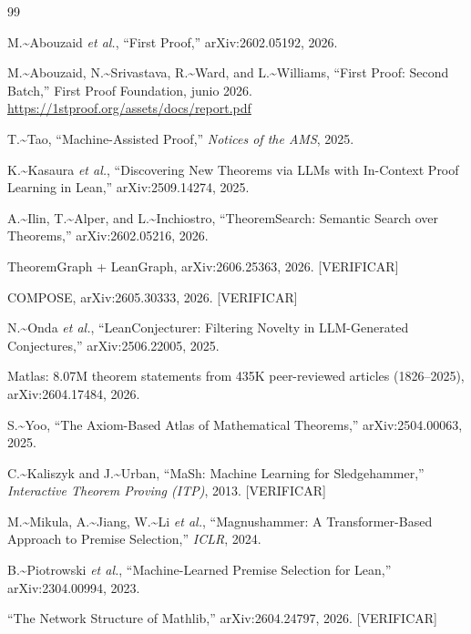 \documentclass[12pt,a4paper]{article}
\theoremstyle{remark}
\begin{document}
\begin{thebibliography}{99}

M.\textasciitilde{}Abouzaid \emph{et al.}, ``First Proof,''
arXiv:2602.05192, 2026.

M.\textasciitilde{}Abouzaid, N.\textasciitilde{}Srivastava, R.\textasciitilde{}Ward, and L.\textasciitilde{}Williams,
``First Proof: Second Batch,'' First Proof Foundation, junio 2026.
\url{https://1stproof.org/assets/docs/report.pdf}

T.\textasciitilde{}Tao, ``Machine-Assisted Proof,''
\emph{Notices of the AMS}, 2025.

K.\textasciitilde{}Kasaura \emph{et al.}, ``Discovering New Theorems via LLMs with In-Context Proof Learning in Lean,''
arXiv:2509.14274, 2025.

A.\textasciitilde{}Ilin, T.\textasciitilde{}Alper, and L.\textasciitilde{}Inchiostro, ``TheoremSearch: Semantic Search over Theorems,''
arXiv:2602.05216, 2026.

TheoremGraph + LeanGraph, arXiv:2606.25363, 2026. {[}VERIFICAR{]}

COMPOSE, arXiv:2605.30333, 2026. {[}VERIFICAR{]}

N.\textasciitilde{}Onda \emph{et al.}, ``LeanConjecturer: Filtering Novelty in LLM-Generated Conjectures,''
arXiv:2506.22005, 2025.

Matlas: 8.07M theorem statements from 435K peer-reviewed articles (1826--2025),
arXiv:2604.17484, 2026.

S.\textasciitilde{}Yoo, ``The Axiom-Based Atlas of Mathematical Theorems,''
arXiv:2504.00063, 2025.

C.\textasciitilde{}Kaliszyk and J.\textasciitilde{}Urban, ``MaSh: Machine Learning for Sledgehammer,''
\emph{Interactive Theorem Proving (ITP)}, 2013. {[}VERIFICAR{]}

M.\textasciitilde{}Mikula, A.\textasciitilde{}Jiang, W.\textasciitilde{}Li \emph{et al.}, ``Magnushammer: A Transformer-Based Approach to Premise Selection,''
\emph{ICLR}, 2024.

B.\textasciitilde{}Piotrowski \emph{et al.}, ``Machine-Learned Premise Selection for Lean,''
arXiv:2304.00994, 2023.

``The Network Structure of Mathlib,''
arXiv:2604.24797, 2026. {[}VERIFICAR{]}


\end{thebibliography}
\end{document}

